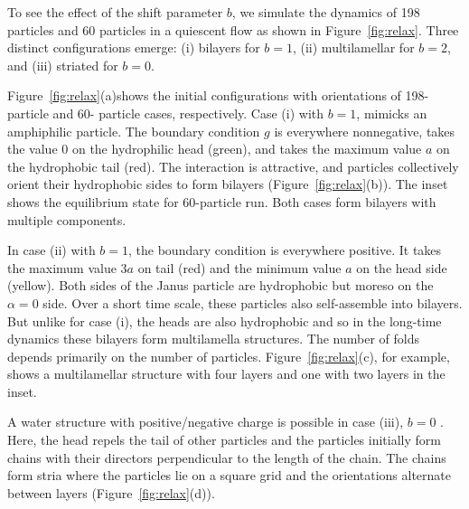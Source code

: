 \documentclass[aps,prl,preprint,groupedaddress]{revtex4-2}
\begin{document}
To see the effect of the shift parameter $b$, we simulate the dynamics of
198 particles and 60 particles in a quiescent flow as shown in Figure~\ref{fig:relax}.
Three distinct configurations emerge:
(i) bilayers for $b = 1$, 
(ii) multilamellar for $b = 2$, and 
(iii) striated for $b = 0$.

Figure~\ref{fig:relax}(a)shows the initial configurations with orientations of 198-particle and 60- particle cases,
respectively. 
Case (i) with $b = 1$, mimicks an amphiphilic particle.
The boundary condition $g$ is everywhere nonnegative,
takes the value $0$ on the
hydrophilic head (green),
and takes the maximum value $a$ on the
hydrophobic tail (red). 
The interaction is attractive, and particles collectively orient their
hydrophobic sides to form bilayers  (Figure~\ref{fig:relax}(b)). The inset shows the equilibrium 
state for 60-particle run.
Both cases form bilayers with multiple components. 

In case (ii) with $b = 1$, the boundary condition is everywhere positive.
It takes the maximum value $3a$ on tail (red) and the
minimum value $a$ on the head side (yellow). 
Both sides of the Janus particle are hydrophobic but
moreso on the $\alpha = 0$ side.  
Over a short time scale, these particles also self-assemble into bilayers. But unlike for case (i),
the heads are also hydrophobic and so in the long-time dynamics
these bilayers form multilamella structures.
The number of folds depends primarily on the number of particles.
Figure~\ref{fig:relax}(c), for example, shows a
multilamellar structure with four layers and one with two layers in the inset.

A water structure with
positive/negative charge is possible in case (iii), $b = 0$
\cite{MaRa76, Ma77}.
Here, the head repels the tail of other particles
and the particles initially form chains with their directors perpendicular
to the length of the chain.  
The chains form stria
where the particles lie on a 
square grid and the orientations alternate
between layers (Figure~\ref{fig:relax}(d)).
\end{document}

